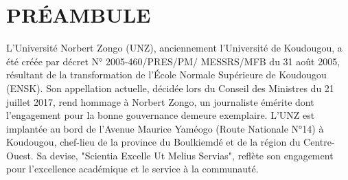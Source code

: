 \chapter*{PRÉAMBULE}
\thispagestyle{MyStyle}

L'Université Norbert Zongo (UNZ), anciennement l'Université de Koudougou, a été créée par décret N° 2005-460/PRES/PM/ MESSRS/MFB du 31 août 2005, résultant de la transformation de l'École Normale Supérieure de Koudougou (ENSK). Son appellation actuelle, décidée lors du Conseil des Ministres du 21 juillet 2017, rend hommage à Norbert Zongo, un journaliste émérite dont l'engagement pour la bonne gouvernance demeure exemplaire. L'UNZ est implantée au bord de l'Avenue Maurice Yaméogo (Route Nationale N°14) à Koudougou, chef-lieu de la province du Boulkiemdé et de la région du Centre-Ouest. Sa devise, "Scientia Excelle Ut Melius Servias", reflète son engagement pour l'excellence académique et le service à la communauté.

